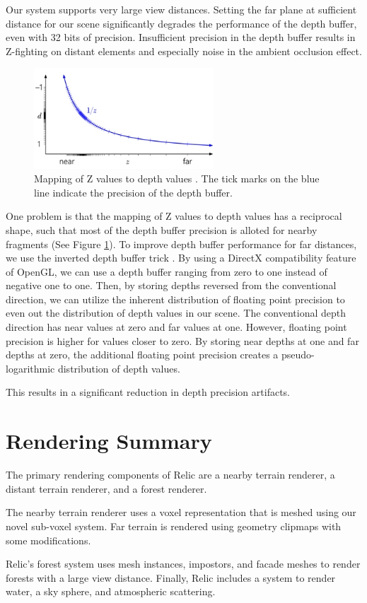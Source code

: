 Our system supports very large view distances.
Setting the far plane at sufficient distance for our scene significantly degrades the performance of the depth buffer, even with 32 bits of precision.
Insufficient precision in the depth buffer results in Z-fighting on distant elements and especially noise in the ambient occlusion effect.

\begin{figure}
	\centering
		\includegraphics[width=0.6\textwidth]{figures/nvidia_precision_1.jpg}
	\caption{Mapping of Z values to depth values \cite{nvidia_depth_precision}. The tick marks on the blue line indicate the precision of the depth buffer.}
	\label{fig:nvidia_precision_1}
\end{figure}

One problem is that the mapping of Z values to depth values has a reciprocal shape, such that most of the depth buffer precision is alloted for nearby fragments (See Figure \ref{fig:nvidia_precision_1}).
To improve depth buffer performance for far distances, we use the inverted depth buffer trick \cite{nvidia_depth_precision}.
By using a DirectX compatibility feature of OpenGL, we can use a depth buffer ranging from zero to one instead of negative one to one.
Then, by storing depths reversed from the conventional direction, we can utilize the inherent distribution of floating point precision to even out the distribution of depth values in our scene.
The conventional depth direction has near values at zero and far values at one.
However, floating point precision is higher for values closer to zero.
By storing near depths at one and far depths at zero, the additional floating point precision creates a pseudo-logarithmic distribution of depth values.

This results in a significant reduction in depth precision artifacts.


\section{Rendering Summary}

The primary rendering components of Relic are a nearby terrain renderer, a distant terrain renderer, and a forest renderer.

The nearby terrain renderer uses a voxel representation that is meshed using our novel sub-voxel system.
Far terrain is rendered using geometry clipmaps with some modifications.

Relic's forest system uses mesh instances, impostors, and facade meshes to render forests with a large view distance.
Finally, Relic includes a system to render water, a sky sphere, and atmospheric scattering.
